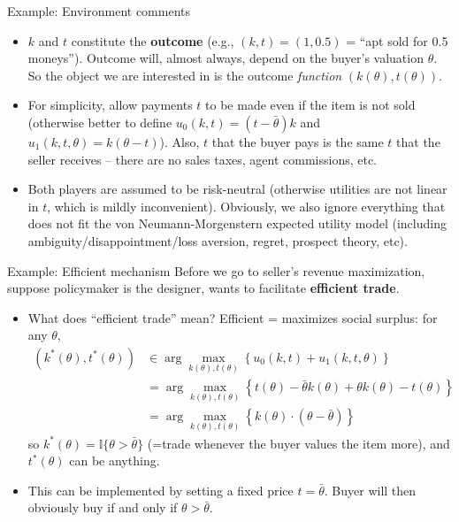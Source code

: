\documentclass[english,10pt
,aspectratio=169
]{beamer}
\begin{document}
\begin{frame}{Example: Environment comments}
	\begin{itemize}
		\item $k$ and $t$ constitute the \textbf{outcome} (e.g., $(k,t)=(1,0.5)$ = ``apt sold for 0.5 moneys''). Outcome will, almost always, depend on the buyer's valuation $\theta$. So the object we are interested in is the outcome \emph{function} $(k(\theta), t(\theta))$.
		
		\item For simplicity, allow payments $t$ to be made even if the item is not sold (otherwise better to define $u_0(k,t) = (t - \bar{\theta}) k$ and $u_1(k,t,\theta) = k (\theta - t)$). Also, $t$ that the buyer pays is the same $t$ that the seller receives -- there are no sales taxes, agent commissions, etc.
		
		\item Both players are assumed to be risk-neutral (otherwise utilities are not linear in $t$, which is mildly inconvenient). Obviously, we also ignore everything that does not fit the von Neumann-Morgenstern expected utility model (including ambiguity/disappointment/loss aversion, regret, prospect theory, etc).
	\end{itemize}
\end{frame}


\begin{frame}{Example: Efficient mechanism}
	Before we go to seller's revenue maximization, suppose policymaker is the designer, wants to facilitate \textbf{efficient trade}.
	
	\begin{itemize}
		\item What does ``efficient trade'' mean?
		\pause
		Efficient = maximizes social surplus: for any $\theta$,
		\begin{align*}
			(k^*(\theta),t^*(\theta)) &\in \arg \max_{k(\theta),t(\theta)} \left\{ u_0(k,t) + u_1(k,t,\theta) \right\}
			\\
			&= \arg \max_{k(\theta),t(\theta)} \left\{ t(\theta) - \bar{\theta} k(\theta) + \theta k(\theta) - t(\theta) \right\}
			\\
			&= \arg \max_{k(\theta),t(\theta)} \left\{ k(\theta) \cdot (\theta - \bar{\theta})  \right\}
		\end{align*}
		\pause
		so $k^*(\theta) = \mathbb{I} \{ \theta > \bar{\theta} \}$ (=trade whenever the buyer values the item more), and $t^*(\theta)$ can be anything.
		\pause
		\item This can be implemented by setting a fixed price $t = \bar{\theta}$. Buyer will then obviously buy if and only if $\theta > \bar{\theta}$.
	\end{itemize}
\end{frame}
\end{document}
